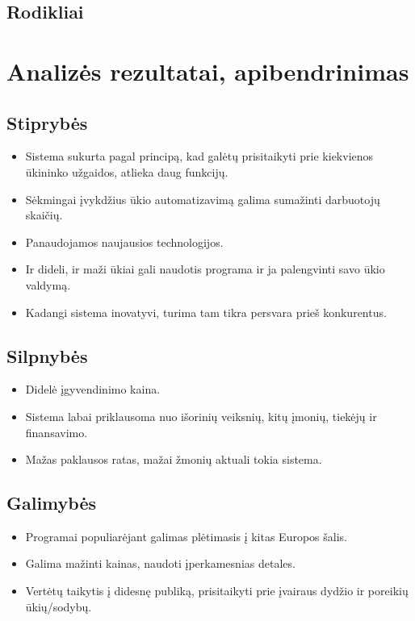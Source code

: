 \documentclass[oneside]{VUMIFPSkursinis}
\begin{document}
	\subsection{Rodikliai}
\section{Analizės rezultatai, apibendrinimas}
	\subsection{Stiprybės}
	\begin{itemize}
	\item Sistema sukurta pagal principą, kad galėtų prisitaikyti prie kiekvienos ūkininko užgaidos, atlieka daug funkcijų.
	\item Sėkmingai įvykdžius ūkio automatizavimą galima sumažinti darbuotojų skaičių.
	\item Panaudojamos naujausios technologijos.
	\item Ir dideli, ir maži ūkiai gali naudotis programa ir ja palengvinti savo ūkio valdymą.
	\item Kadangi sistema inovatyvi, turima tam tikra persvara prieš konkurentus.
	\end{itemize}
	\subsection{Silpnybės}
	\begin{itemize}
	\item Didelė įgyvendinimo kaina.
	\item Sistema labai priklausoma nuo išorinių veiksnių, kitų įmonių, tiekėjų ir finansavimo.
	\item Mažas paklausos ratas, mažai žmonių aktuali tokia sistema.
	\end{itemize}
	\subsection{Galimybės}
	\begin{itemize}
	\item Programai populiarėjant galimas plėtimasis į kitas Europos šalis.
	\item Galima mažinti kainas, naudoti įperkamesnias detales.
	\item Vertėtų taikytis į didesnę publiką, prisitaikyti prie įvairaus dydžio ir poreikių ūkių/sodybų.
	\end{itemize}
\end{document}
